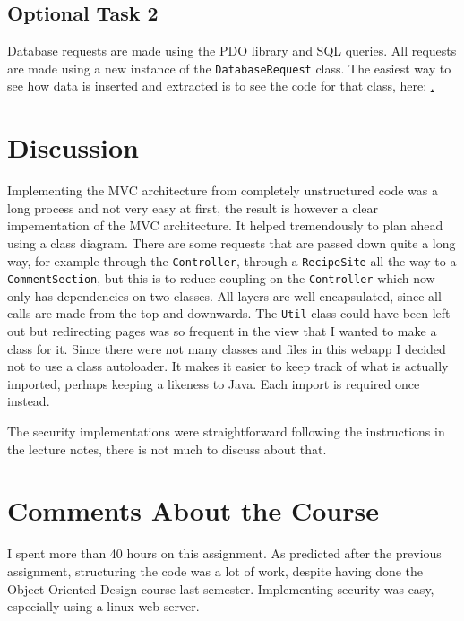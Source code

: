 \documentclass[a4paper]{scrreprt}
\newcommand{\code}[1]{\texttt{#1}}
\begin{document}
\section{Optional Task 2}

Database requests are made using the PDO library and SQL queries. All requests are made using a new instance of the \code{DatabaseRequest} class. The easiest way to see how data is inserted and extracted is to see the code for that class, here: \href{https://github.com/fongie/TastyRecipes/blob/assignment3/src/integration/DatabaseRequest.php}.

\chapter{Discussion}

Implementing the MVC architecture from completely unstructured code was a long process and not very easy at first, the result is however a clear impementation of the MVC architecture. It helped tremendously to plan ahead using a class diagram. There are some requests that are passed down quite a long way, for example through the \code{Controller}, through a \code{RecipeSite} all the way to a \code{CommentSection}, but this is to reduce coupling on the \code{Controller} which now only has dependencies on two classes. All layers are well encapsulated, since all calls are made from the top and downwards. The \code{Util} class could have been left out but redirecting pages was so frequent in the view that I wanted to make a class for it. Since there were not many classes and files in this webapp I decided not to use a class autoloader. It makes it easier to keep track of what is actually imported, perhaps keeping a likeness to Java. Each import is required once instead.

The security implementations were straightforward following the instructions in the lecture notes, there is not much to discuss about that.

\chapter{Comments About the Course}

I spent more than 40 hours on this assignment.
As predicted after the previous assignment, structuring the code was a lot of work, despite having done the Object Oriented Design course last semester.
Implementing security was easy, especially using a linux web server.
\end{document}
